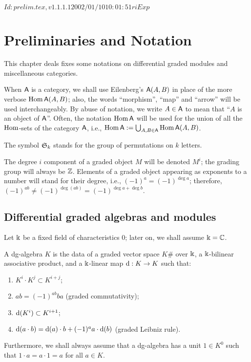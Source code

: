 \RCSID $Id: prelim.tex,v 1.1.1.1 2002/01/10 10:01:51 ri Exp $


\chapter{Preliminaries and Notation}

This chapter deals fixes some notations on differential graded modules
and miscellaneous categories. 

When $\mathsf{A}$ is a category, we shall use Eilenberg's $\mathsf{A}(A, B)$ in place
of the more verbose $\operatorname{Hom} \mathsf{A}(A, B)$; also, the words ``morphism'',
``map'' and ``arrow'' will be used interchangeably. By abuse of
notation, we write $A \in \mathsf{A}$ to mean that ``$A$ is an object of
$\mathsf{A}$''. Often, the notation $\operatorname{Hom}\mathsf{A}$ will be used for the union of all
the $\operatorname{Hom}$-sets of the category $\mathsf{A}$, i.e., $\operatorname{Hom}\mathsf{A} := \bigcup_{A,B \in \mathsf{A}}
\operatorname{Hom}\mathsf{A}(A,B)$.

The symbol $\mathfrak{S}_{k}$ stands for the group of permutations on $k$
letters.

The degree $i$ component of a graded object $M$ will be denoted
$M^i$; the grading group will always be $\mathbb{Z}$. Elements of a graded
object appearing as exponents to a number will stand for their degree,
i.e., $(-1)^a = (-1)^{\deg a}$; therefore, $(-1)^{ab} \not=
(-1)^{\deg (ab)} = (-1)^{\deg a + \deg b}$.


\section{Differential graded algebras and modules}
\label{sec:dg-things}

Let $\Bbbk$ be a fixed field of characteristics $0$; later on, we shall
assume $\Bbbk = \mathbb{C}$.
\begin{definition}
  A dg-algebra $K$ is the data of a graded vector space $K\#$
  over $\Bbbk$, a $\Bbbk$-bilinear associative product, and a
  $\Bbbk$-linear map $\mathrm{d}: K\to K$ such that:
  \begin{enumerate}
  \item $K^i \cdot K^j \subset K^{i+j}$;
  \item $ab = (-1)^{ab} ba$ (graded commutativity);
  \item $\mathrm{d}(K^i) \subset K^{i+1}$;
  \item $\mathrm{d}(a\cdot b) = \mathrm{d}(a)\cdot b + (-1)^a a\cdot\mathrm{d}(b)$ (graded Leibniz rule).
  \end{enumerate}
  Furthermore, we shall always assume that a dg-algebra has a unit
  $1\in K^0$ such that $1\cdot a = a\cdot 1 = a$ for all $a\in
  K$.
\end{definition}

